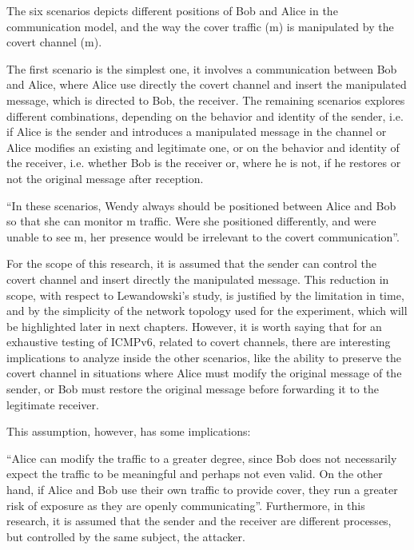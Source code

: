 \documentclass[12pt]{article}
\begin{document}
The six scenarios depicts different positions of Bob and Alice in the communication model, and the way the cover traffic (m) is manipulated by the covert channel (m\textprime).

The first scenario is the simplest one, it involves a communication between Bob and Alice, where Alice use directly the covert channel and insert the manipulated message, which is directed to Bob, the receiver. The remaining scenarios explores different combinations, depending on the behavior and identity of the sender, i.e. if Alice is the sender and introduces a manipulated message in the channel or Alice modifies an existing and legitimate one, or on the behavior and identity of the receiver, i.e. whether Bob is the receiver or, where he is not, if he restores or not the original message after reception.

``In these scenarios, Wendy always should be positioned between Alice and Bob so that she can monitor m\textprime\hspace{2pt} traffic. Were she positioned differently, and were unable to see m\textprime, her presence would be irrelevant to the covert communication''\cite{lewandowski}.

For the scope of this research, it is assumed that the sender can control the covert channel and insert directly the manipulated message. This reduction in scope, with respect to Lewandowski's study, is justified by the limitation in time, and by the simplicity of the network topology used for the experiment, which will be highlighted later in next chapters. However, it is worth saying that for an exhaustive testing of ICMPv6, related to covert channels, there are interesting implications to analyze inside the other scenarios, like the ability to preserve the covert channel in situations where Alice must modify the original message of the sender, or Bob must restore the original message before forwarding it to the legitimate receiver.

This assumption, however, has some implications:

``Alice can modify the traffic to a greater degree, since Bob does not necessarily expect the traffic to be meaningful and perhaps not even valid. On the other hand, if Alice and Bob use their own traffic to provide cover, they run a greater risk of exposure as they are openly communicating''\cite{lewandowski}. Furthermore, in this research, it is assumed that the sender and the receiver are different processes, but controlled by the same subject, the attacker.
\end{document}
